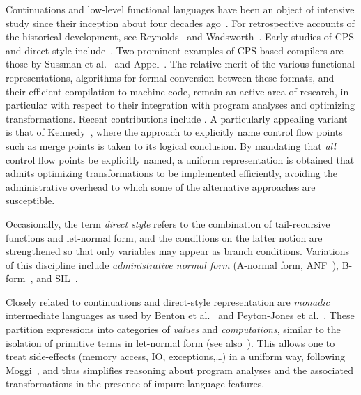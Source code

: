 Continuations and low-level functional languages have been an object
of intensive study since their inception about four decades
ago~\cite{vanWijngaarden1966,Landin1965}.  For retrospective accounts
of the historical development, see Reynolds~\cite{Reynolds:LSC1993}
and Wadsworth~\cite{Wadsworth00}. Early studies of CPS and direct
style include~\cite{Reynolds:1972,Reynolds1974,Plotkin75}.  Two
prominent examples of CPS-based compilers are those by Sussman et
al.~\cite{DBLP:journals/lisp/SussmanS98a} and Appel~\cite{Appel:CWC}.
The relative merit of the various functional representations,
algorithms for formal conversion between these formats, and their
efficient compilation to machine code, remain an active area of
research, in particular with respect to their integration with program
analyses and optimizing transformations.  Recent contributions include
\cite{DBLP:journals/jfp/DanvyMN07,DBLP:journals/lisp/Reppy02,DBLP:conf/icfp/Kennedy07}. 
A particularly appealing variant is that of
Kennedy~\cite{DBLP:conf/icfp/Kennedy07}, where the approach to
explicitly name control flow points such as merge points is taken to
its logical conclusion. By mandating that \emph{all} control flow
points be explicitly named, a uniform representation is obtained that
admits optimizing transformations to be implemented efficiently,
avoiding the administrative overhead to which some of the alternative
approaches are susceptible.


Occasionally, the term \emph{direct style} refers to the combination
of tail-recursive functions and let-normal form, and the conditions on
the latter notion are strengthened so that only variables may appear
as branch conditions. Variations of this discipline include
\emph{administrative normal form} (A-normal form,
ANF~\cite{DBLP:conf/pldi/FlanaganSDF93}),
B-form~\cite{DBLP:conf/pldi/TarditiMCSHL96}, and
SIL~\cite{DBLP:journals/jfp/TolmachO98}.

Closely related to continuations and direct-style representation are
\emph{monadic} intermediate languages as used by Benton et
al.~\cite{BentonKennedyRussel:ICFP1998} and Peyton-Jones et
al.~\cite{PeytonJonesShieldsLT:POPL1998}. These partition expressions
into categories of \emph{values} and
\emph{computations}, similar to the isolation of primitive terms in
let-normal form (see also~\cite{Reynolds1974,Plotkin75}). This allows
one to treat side-effects (memory access, IO, exceptions,\ldots) in a
uniform way, following Moggi~\cite{Moggi1991}, and thus simplifies
reasoning about program analyses and the associated transformations in
the presence of impure language features.

